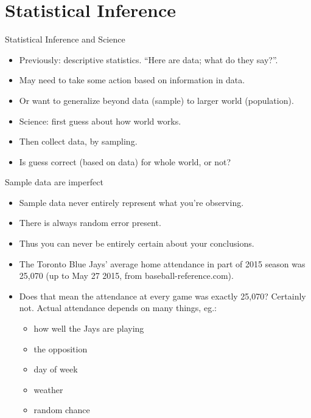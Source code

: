 \documentclass[
  ignorenonframetext,
]{beamer}
\providecommand{\tightlist}{%
  \setlength{\itemsep}{0pt}\setlength{\parskip}{0pt}}
\begin{document}
\hypertarget{statistical-inference}{%
\section{Statistical Inference}\label{statistical-inference}}

\begin{frame}{Statistical Inference and Science}
\protect\hypertarget{statistical-inference-and-science}{}

\begin{itemize}
\tightlist
\item
  Previously: descriptive statistics. ``Here are data; what do they
  say?''.
\item
  May need to take some action based on information in data.
\item
  Or want to generalize beyond data (sample) to larger world
  (population).
\item
  Science: first guess about how world works.
\item
  Then collect data, by sampling.
\item
  Is guess correct (based on data) for whole world, or not?
\end{itemize}

\end{frame}

\begin{frame}{Sample data are imperfect}
\protect\hypertarget{sample-data-are-imperfect}{}

\begin{itemize}
\tightlist
\item
  Sample data never entirely represent what you're observing.
\item
  There is always random error present.
\item
  Thus you can never be entirely certain about your conclusions.
\item
  The Toronto Blue Jays' average home attendance in part of 2015 season
  was 25,070 (up to May 27 2015, from baseball-reference.com).
\item
  Does that mean the attendance at every game was exactly 25,070?
  Certainly not. Actual attendance depends on many things, eg.:

  \begin{itemize}
  \tightlist
  \item
    how well the Jays are playing
  \item
    the opposition
  \item
    day of week
  \item
    weather
  \item
    random chance
  \end{itemize}
\end{itemize}

\end{frame}
\end{document}
